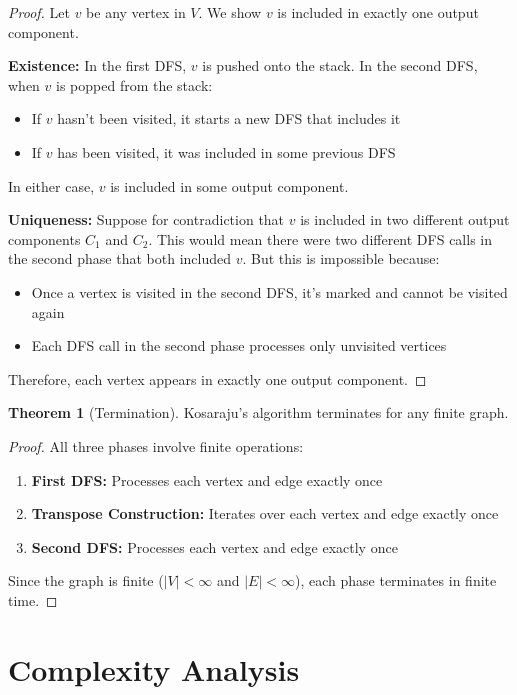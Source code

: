\documentclass{book}
\theoremstyle{definition}
\newtheorem{theorem}[definition]{Theorem}
\begin{document}
\begin{proof}
Let $v$ be any vertex in $V$. We show $v$ is included in exactly one output component.

\textbf{Existence:} In the first DFS, $v$ is pushed onto the stack. In the second DFS, when $v$ is popped from the stack:
\begin{itemize}
    \item If $v$ hasn't been visited, it starts a new DFS that includes it
    \item If $v$ has been visited, it was included in some previous DFS
\end{itemize}
In either case, $v$ is included in some output component.

\textbf{Uniqueness:} Suppose for contradiction that $v$ is included in two different output components $C_1$ and $C_2$. This would mean there were two different DFS calls in the second phase that both included $v$. But this is impossible because:
\begin{itemize}
    \item Once a vertex is visited in the second DFS, it's marked and cannot be visited again
    \item Each DFS call in the second phase processes only unvisited vertices
\end{itemize}
Therefore, each vertex appears in exactly one output component.
\end{proof}

\begin{theorem}[Termination]
Kosaraju's algorithm terminates for any finite graph.
\end{theorem}

\begin{proof}
All three phases involve finite operations:
\begin{enumerate}
    \item \textbf{First DFS:} Processes each vertex and edge exactly once
    \item \textbf{Transpose Construction:} Iterates over each vertex and edge exactly once  
    \item \textbf{Second DFS:} Processes each vertex and edge exactly once
\end{enumerate}
Since the graph is finite ($|V| < \infty$ and $|E| < \infty$), each phase terminates in finite time.
\end{proof}


\chapter{Complexity Analysis}
\end{document}
